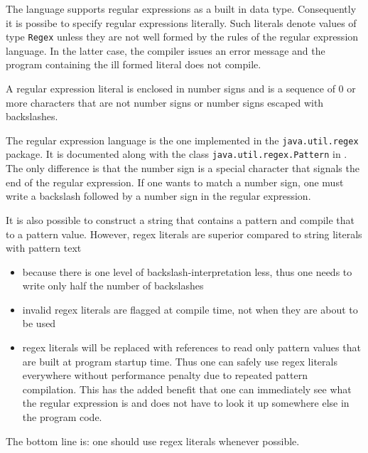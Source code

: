 The \frege{} language supports regular expressions as a built in data type. Consequently it is possibe to specify regular expressions literally. Such literals denote values of type \texttt{Regex} unless they are not well formed by the rules of the regular expression language. In the latter case, the compiler issues an error message and the program containing the ill formed literal does not compile.

\begin{flushleft}
 \regex{\#($\backslash{}\backslash{}$\#|[\symbol{94}\#])*\#}
\end{flushleft}

A regular expression literal is enclosed in number signs and is a sequence of 0 or more characters that are not number signs or number signs escaped with backslashes.

The regular expression language is the one implemented in the \texttt{java.util.regex} package. It is documented along with the class \texttt{java.util.regex.Pattern} in \cite{apidoc}.
The only difference is that the number sign is a special character that signals the end of the regular expression.
If one wants to match a number sign, one must write a backslash followed by a number sign in the regular expression.


It is also possible to construct a string that contains a pattern and compile that to a pattern value. However, regex literals are superior compared to string literals with pattern text
\begin{itemize}
\item because there is one level of backslash-interpretation less, thus one needs to write only half the number of backslashes
\item invalid regex literals are flagged at compile time, not when they are about to be used
\item regex literals will be replaced with references to read only pattern values that are built at program startup time. Thus one can safely use regex literals everywhere without performance penalty due to repeated pattern compilation. This has the added benefit that one can immediately see what the regular expression is and does not have to look it up somewhere else in the program code.
\end{itemize}
The bottom line is: one should use regex literals whenever possible.


